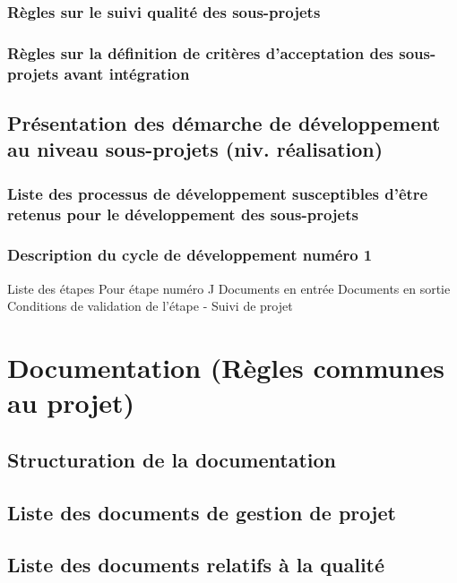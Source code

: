 \documentclass[a4paper]{article}
\begin{document}
\subsubsection{Règles sur le suivi qualité des sous-projets}

\subsubsection{Règles sur la définition de critères d'acceptation des sous-projets avant intégration}

\subsection{Présentation des démarche de développement au niveau sous-projets (niv. réalisation)}

\subsubsection{Liste des processus de développement susceptibles d'être retenus pour le développement des sous-projets}

\subsubsection{Description du cycle de développement numéro 1}

Liste des étapes
Pour étape numéro J
Documents en entrée
Documents en sortie
Conditions de validation de l'étape
      -     Suivi de projet

\section{Documentation (Règles communes au projet)}

\subsection{Structuration de la documentation}

\subsection{Liste des documents de gestion de projet}

\subsection{Liste des documents relatifs à la qualité}
\end{document}
